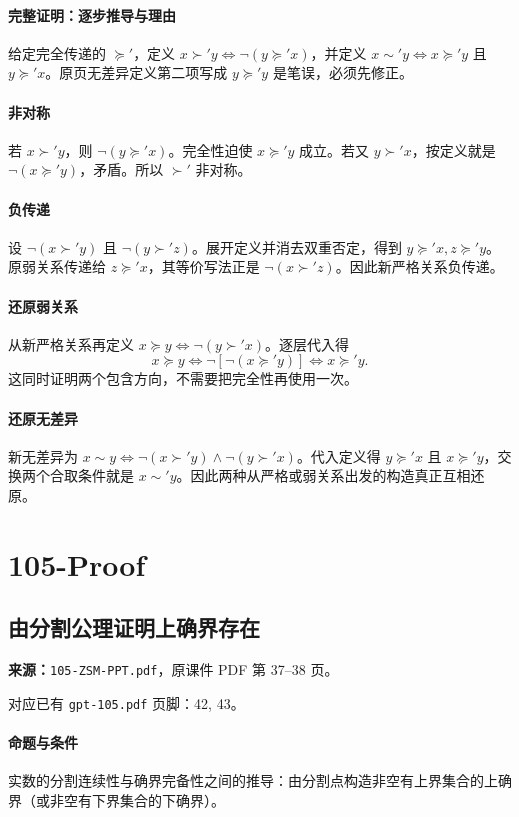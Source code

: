 \paragraph{完整证明：逐步推导与理由}

给定完全传递的 $\succeq'$，定义 $x\succ' y\iff\neg(y\succeq' x)$，并定义 $x\sim' y\iff x\succeq' y$ 且 $y\succeq' x$。原页无差异定义第二项写成 $y\succeq' y$ 是笔误，必须先修正。
\paragraph{非对称}若 $x\succ' y$，则 $\neg(y\succeq' x)$。完全性迫使 $x\succeq' y$ 成立。若又 $y\succ' x$，按定义就是 $\neg(x\succeq' y)$，矛盾。所以 $\succ'$ 非对称。
\paragraph{负传递}设 $\neg(x\succ' y)$ 且 $\neg(y\succ' z)$。展开定义并消去双重否定，得到 $y\succeq' x,z\succeq' y$。原弱关系传递给 $z\succeq' x$，其等价写法正是 $\neg(x\succ' z)$。因此新严格关系负传递。
\paragraph{还原弱关系}从新严格关系再定义 $x\succeq y\iff\neg(y\succ' x)$。逐层代入得
\[x\succeq y\iff\neg[\neg(x\succeq' y)]\iff x\succeq' y.\]
这同时证明两个包含方向，不需要把完全性再使用一次。
\paragraph{还原无差异}新无差异为 $x\sim y\iff\neg(x\succ' y)\land\neg(y\succ' x)$。代入定义得 $y\succeq' x$ 且 $x\succeq' y$，交换两个合取条件就是 $x\sim' y$。因此两种从严格或弱关系出发的构造真正互相还原。

\clearpage\section{105-Proof}
\clearpage\subsection{由分割公理证明上确界存在}
\textbf{来源：}\texttt{105-ZSM-PPT.pdf}，原课件 PDF 第 37--38 页。\par
对应已有 \texttt{gpt-105.pdf} 页脚：42, 43。\par
\paragraph{命题与条件}实数的分割连续性与确界完备性之间的推导：由分割点构造非空有上界集合的上确界（或非空有下界集合的下确界）。
